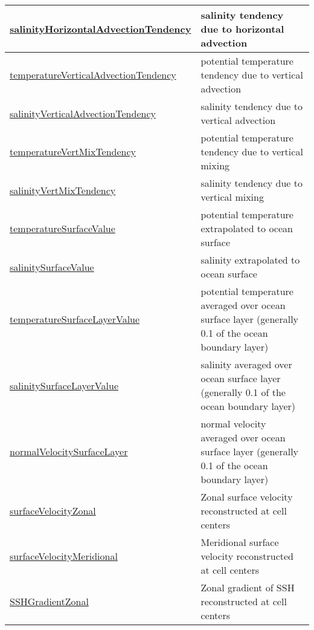 {\begin{center}
\begin{longtable}{| p{2.0in} | p{4.0in} |}
    \hline
    \hyperref[subsec:var_sec_diagnostics_salinityHorizontalAdvectionTendency]{salinityHorizontalAdvection\-Tendency} & salinity tendency due to horizontal advection \\
    \hline
    \hyperref[subsec:var_sec_diagnostics_temperatureVerticalAdvectionTendency]{temperatureVerticalAdvection\-Tendency} & potential temperature tendency due to vertical advection \\
    \hline
    \hyperref[subsec:var_sec_diagnostics_salinityVerticalAdvectionTendency]{salinityVerticalAdvection\-Tendency} & salinity tendency due to vertical advection \\
    \hline
    \hyperref[subsec:var_sec_diagnostics_temperatureVertMixTendency]{temperatureVertMixTendency} & potential temperature tendency due to vertical mixing \\
    \hline
    \hyperref[subsec:var_sec_diagnostics_salinityVertMixTendency]{salinityVertMixTendency} & salinity tendency due to vertical mixing \\
    \hline
    \hyperref[subsec:var_sec_diagnostics_temperatureSurfaceValue]{temperatureSurfaceValue} & potential temperature extrapolated to ocean surface \\
    \hline
    \hyperref[subsec:var_sec_diagnostics_salinitySurfaceValue]{salinitySurfaceValue} & salinity extrapolated to ocean surface \\
    \hline
    \hyperref[subsec:var_sec_diagnostics_temperatureSurfaceLayerValue]{temperatureSurfaceLayerValue} & potential temperature averaged over ocean surface layer (generally 0.1 of the ocean boundary layer) \\
    \hline
    \hyperref[subsec:var_sec_diagnostics_salinitySurfaceLayerValue]{salinitySurfaceLayerValue} & salinity averaged over ocean surface layer (generally 0.1 of the ocean boundary layer) \\
    \hline
    \hyperref[subsec:var_sec_diagnostics_normalVelocitySurfaceLayer]{normalVelocitySurfaceLayer} & normal velocity averaged over ocean surface layer (generally 0.1 of the ocean boundary layer) \\
    \hline
    \hyperref[subsec:var_sec_diagnostics_surfaceVelocityZonal]{surfaceVelocityZonal} & Zonal surface velocity reconstructed at cell centers \\
    \hline
    \hyperref[subsec:var_sec_diagnostics_surfaceVelocityMeridional]{surfaceVelocityMeridional} & Meridional surface velocity reconstructed at cell centers \\
    \hline
    \hyperref[subsec:var_sec_diagnostics_SSHGradientZonal]{SSHGradientZonal} & Zonal gradient of SSH reconstructed at cell centers \\

\end{longtable}
\end{center}}
